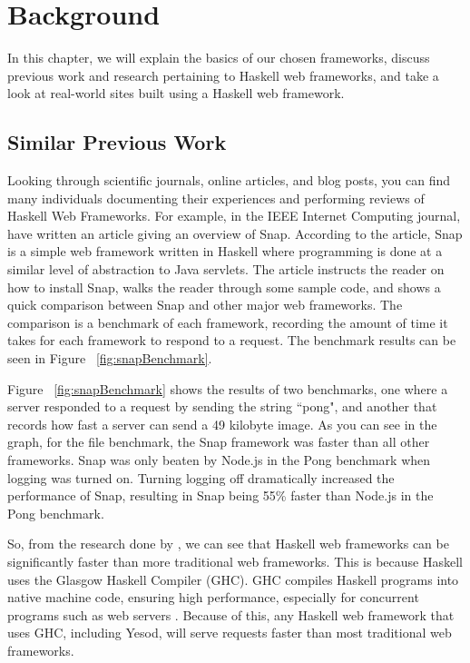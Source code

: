 \chapter{Background}
\label{chap:Background}

In this chapter, we will explain the basics of our chosen frameworks,
discuss previous work and research pertaining
to Haskell web frameworks, and take a look at real-world sites built 
using a Haskell web framework.

\section{Similar Previous Work}

Looking through scientific journals, online articles, and blog posts,
you can find many individuals documenting their experiences and performing
reviews of Haskell Web Frameworks. For example, in the IEEE Internet Computing
journal, \citeauthor{snapFramework} have written an article giving an overview
of Snap. According to the article, Snap is a simple web framework written
in Haskell where programming is done at a similar level of abstraction
to Java servlets. The article instructs the reader on how to install Snap, 
walks the reader through some sample code, and shows a quick comparison
between Snap and other major web frameworks. The comparison is a benchmark
of each framework, recording the amount of time it takes for each framework
to respond to a request. The benchmark results can be seen in Figure 
~\ref{fig:snapBenchmark}. \parencite{snapFramework}

Figure ~\ref{fig:snapBenchmark} shows the results of two benchmarks, one where a server
responded to a request by sending the string ``pong", and another that records how fast
a server can send a 49 kilobyte image. As you can see in the
graph, for the file benchmark, the Snap framework was faster than all other frameworks.
Snap was only beaten by Node.js in the Pong benchmark when logging was turned on.
Turning logging off dramatically increased the performance of Snap, resulting in
Snap being 55\% faster than Node.js in the Pong benchmark. \parencite{snapFramework}

So, from the research done by \citeauthor{snapFramework}, we can see that Haskell
web frameworks can be significantly faster than more traditional web frameworks.
This is because Haskell uses the Glasgow Haskell Compiler (GHC). GHC compiles
Haskell programs into native machine code, ensuring high performance, especially
for concurrent programs such as web servers \parencite{ghcSite}. 
Because of this, any Haskell web framework that uses GHC, including Yesod,
will serve requests faster than most traditional web frameworks.

